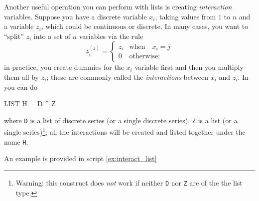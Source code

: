 Another useful operation you can perform with lists is creating
\emph{interaction} variables. Suppose you have a discrete variable
$x_i$, taking values from $1$ to $n$ and a variable $z_i$, which could
be continuous or discrete. In many cases, you want to ``split'' $z_i$
into a set of $n$ variables via the rule
\[
z^(j)_i =\left\{ 
    \begin{array}{ll}
      z_i & \mathrm{when} \quad x_i = j \\
      0 & \mathrm{otherwise;}
    \end{array}
    \right. 
\] 
in practice, you create dummies for the $x_i$ variable first and then
you multiply them all by $z_i$; these are commonly called the
\emph{interactions} between $x_i$ and $z_i$. In  you can do 
\begin{code}
  LIST H = D ^ Z
\end{code}
where \texttt{D} is a list of discrete series (or a single discrete
series), \texttt{Z} is a list (or a single series)\footnote{Warning:
  this construct does \emph{not} work if neither \texttt{D} nor
  \texttt{Z} are of the the list type.}; all the interactions will be
created and listed together under the name \texttt{H}.

An example is provided in script \ref{ex:interact_list}


